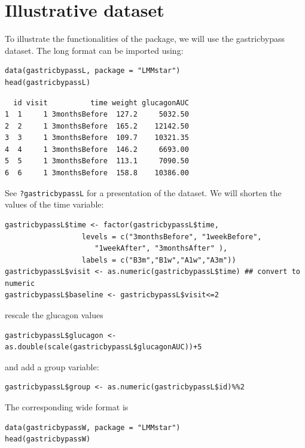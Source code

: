 \documentclass[12pt]{article}
\begin{document}
\clearpage

\section{Illustrative dataset}
\label{sec:org328009f}
To illustrate the functionalities of the package, we will use the
gastricbypass dataset. The long format can be imported using:
\lstset{language=r,label= ,caption= ,captionpos=b,numbers=none}
\begin{lstlisting}
data(gastricbypassL, package = "LMMstar")
head(gastricbypassL)
\end{lstlisting}

\begin{verbatim}
  id visit          time weight glucagonAUC
1  1     1 3monthsBefore  127.2     5032.50
2  2     1 3monthsBefore  165.2    12142.50
3  3     1 3monthsBefore  109.7    10321.35
4  4     1 3monthsBefore  146.2     6693.00
5  5     1 3monthsBefore  113.1     7090.50
6  6     1 3monthsBefore  158.8    10386.00
\end{verbatim}


See \texttt{?gastricbypassL} for a presentation of the dataset. We will
shorten the values of the time variable:
\lstset{language=r,label= ,caption= ,captionpos=b,numbers=none}
\begin{lstlisting}
gastricbypassL$time <- factor(gastricbypassL$time,
			      levels = c("3monthsBefore", "1weekBefore",
					 "1weekAfter", "3monthsAfter" ),
			      labels = c("B3m","B1w","A1w","A3m"))
gastricbypassL$visit <- as.numeric(gastricbypassL$time) ## convert to numeric
gastricbypassL$baseline <- gastricbypassL$visit<=2
\end{lstlisting}
rescale the glucagon values
\lstset{language=r,label= ,caption= ,captionpos=b,numbers=none}
\begin{lstlisting}
gastricbypassL$glucagon <- as.double(scale(gastricbypassL$glucagonAUC))+5
\end{lstlisting}

and add a group variable:
\lstset{language=r,label= ,caption= ,captionpos=b,numbers=none}
\begin{lstlisting}
gastricbypassL$group <- as.numeric(gastricbypassL$id)%%2
\end{lstlisting}

The corresponding wide format is
\lstset{language=r,label= ,caption= ,captionpos=b,numbers=none}
\begin{lstlisting}
data(gastricbypassW, package = "LMMstar")
head(gastricbypassW)
\end{lstlisting}
\end{document}
